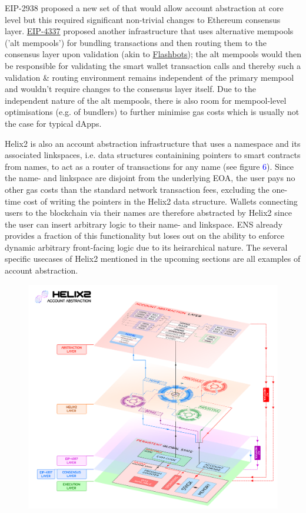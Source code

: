 \documentclass[a4paper,10pt]{article}
\begin{document}
\begin{flushleft}
{{		EIP-2938 proposed a new set of  that would allow account abstraction at core level but this required significant non-trivial changes to Ethereum consensus layer. \href{https://eips.ethereum.org/EIPS/eip-4337}{EIP-4337} proposed another infrastructure that uses alternative mempools ('alt mempools') for bundling transactions and then routing them to the consensus layer upon validation (akin to \href{https://www.flashbots.net/}{Flashbots}); the alt mempools would then be responsible for validating the smart wallet transaction calls and thereby such a validation \& routing environment remains independent of the primary mempool and wouldn't require changes to the consensus layer itself. Due to the independent nature of the alt mempools, there is also room for mempool-level optimisations (e.g. of bundlers) to further minimise gas costs which is usually not the case for typical dApps.\linebreak
		
		Helix2 is also an account abstraction infrastructure that uses a namespace and its associated linkspaces, i.e. data structures containining pointers to smart contracts from names, to act as a router of transactions for any name (see figure \textcolor{blue}{6}). Since the name- and linkspace are disjoint from the underlying EOA, the user pays no other gas costs than the standard network transaction fees, excluding the one-time cost of writing the pointers in the Helix2 data structure. Wallets connecting users to the blockchain via their names are therefore abstracted by Helix2 since the user can insert arbitrary logic to their name- and linkspace. ENS already provides a fraction of this functionality but loses out on the ability to enforce dynamic arbitrary front-facing logic due to its heirarchical nature. The several specific usecases of Helix2 mentioned in the upcoming sections are all examples of account abstraction.
	}}
\end{flushleft}
\begin{figure}[ht!]
 	\centering\includegraphics[width=160mm]{../schema/png/abstraction.png}
	\label{fig:aa}
\end{figure}
\end{document}
